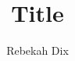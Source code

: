 \documentclass[11pt]{article}
\title{Title}
\author{Rebekah Dix}
\begin{document}
\maketitle

\tableofcontents
\listoftodos

\newpage
\printbibliography
\end{document}
